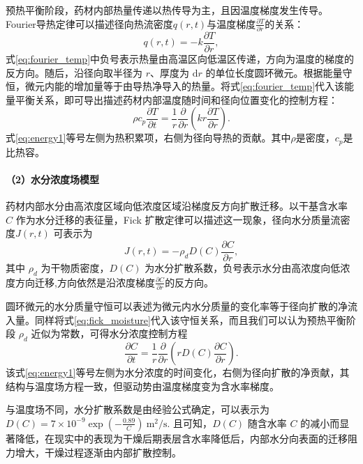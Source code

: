 \documentclass[12pt,a4paper]{article}
\begin{document}
预热平衡阶段，药材内部热量传递以热传导为主，且因温度梯度发生传导。Fourier导热定律可以描述径向热流密度$q(r,t)$与温度梯度$\frac{\partial T}{\partial r}$的关系：
\begin{equation}
    q(r,t)=-k\frac{\partial T}{\partial r},
    \label{eq:fourier_temp}
\end{equation}
式\eqref{eq:fourier_temp}中负号表示热量由高温区向低温区传递，方向为温度的梯度的反方向。随后，沿径向取半径为 \(r\)、厚度为 \(\mathrm{d}r\) 的单位长度圆环微元。根据能量守恒，微元内能的增加量等于由导热净导入的热量。将式\eqref{eq:fourier_temp}代入该能量平衡关系，即可导出描述药材内部温度随时间和径向位置变化的控制方程：
\begin{equation}
    \rho c_p\frac{\partial T}{\partial t}
    =
    \frac{1}{r}\frac{\partial}{\partial r}
    \left(kr\frac{\partial T}{\partial r}\right).
    \label{eq:energy1}
\end{equation}
式\eqref{eq:energy1}等号左侧为热积累项，右侧为径向导热的贡献。其中$\rho$是密度，$c_p$是比热容。

\paragraph{（2）水分浓度场模型}

药材内部水分由高浓度区域向低浓度区域沿梯度反方向扩散迁移。以干基含水率 \(C\) 作为水分迁移的表征量，Fick 扩散定律可以描述这一现象，径向水分质量流密度\(J(r,t)\) 可表示为
\begin{equation}
    J(r,t)=-\rho_dD(C)\frac{\partial C}{\partial r},
    \label{eq:fick_moisture}
\end{equation}
其中 \(\rho_d\) 为干物质密度，\(D(C)\) 为水分扩散系数，负号表示水分由高浓度向低浓度方向迁移,方向依然是沿浓度梯度$\frac{\partial C}{\partial r}$的反方向。

圆环微元的水分质量守恒可以表述为微元内水分质量的变化率等于径向扩散的净流入量。同样将式\eqref{eq:fick_moisture}代入该守恒关系，而且我们可以认为预热平衡阶段 \(\rho_d\) 近似为常数，可得水分浓度控制方程
\begin{equation}
    \frac{\partial C}{\partial t}
    =
    \frac{1}{r}\frac{\partial}{\partial r}
    \left(rD(C)\frac{\partial C}{\partial r}\right).
    \label{eq:moisture1}
\end{equation}
该式\eqref{eq:energy1}等号左侧为水分浓度的时间变化，右侧为径向扩散的净贡献，其结构与温度场方程一致，但驱动势由温度梯度变为含水率梯度。

与温度场不同，水分扩散系数是由经验公式确定，可以表示为
    $D(C)=7\times10^{-9}\exp\left(-\frac{0.89}{C}\right)
    \ \mathrm{m^2/s}.
    \label{eq:diffusivity}$
且可知，\(D(C)\) 随含水率 \(C\) 的减小而显著降低，在现实中的表现为干燥后期表层含水率降低后，内部水分向表面的迁移阻力增大，干燥过程逐渐由内部扩散控制。
\end{document}

